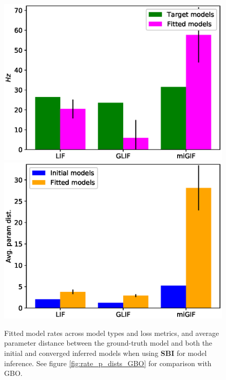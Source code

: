 \documentclass[mphil,deptreport,ianc]{infthesis} %
\begin{document}
\begin{figure}
    \centering
    \vspace{-0.2in}
	\includegraphics[width=0.7\columnwidth]{figures/sbi_plot_rates_all.eps}
	\vspace{-0.1in}
	\includegraphics[width=0.7\columnwidth]{figures/sbi_mean_p_dist_all.eps}
	\vspace{-0.1in}
	\caption{Fitted model rates across model types and loss metrics, and average parameter distance between the ground-truth model and both the initial and converged inferred models when using \textbf{SBI} for model inference. See figure \ref{fig:rate_p_dists_GBO} for comparison with GBO.}
	\label{fig:rate_p_dists_SBI}
\end{figure}
\end{document}

